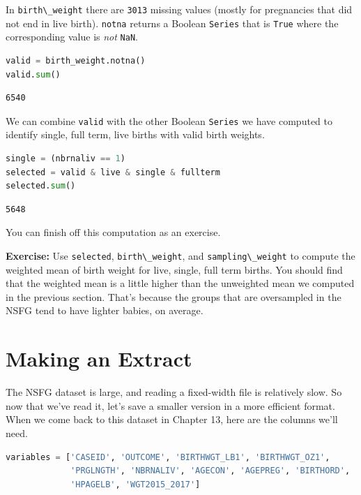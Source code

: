 \documentclass[
]{book}
\newcommand{\passthrough}[1]{#1}
\begin{document}
In \passthrough{\lstinline!birth\_weight!} there are
\passthrough{\lstinline!3013!} missing values (mostly for pregnancies
that did not end in live birth). \passthrough{\lstinline!notna!} returns
a Boolean \passthrough{\lstinline!Series!} that is
\passthrough{\lstinline!True!} where the corresponding value is
\emph{not} \passthrough{\lstinline!NaN!}.

\begin{lstlisting}[language=Python]
valid = birth_weight.notna()
valid.sum()
\end{lstlisting}

\begin{lstlisting}
6540
\end{lstlisting}

We can combine \passthrough{\lstinline!valid!} with the other Boolean
\passthrough{\lstinline!Series!} we have computed to identify single,
full term, live births with valid birth weights.

\begin{lstlisting}[language=Python]
single = (nbrnaliv == 1)
selected = valid & live & single & fullterm
selected.sum()
\end{lstlisting}

\begin{lstlisting}
5648
\end{lstlisting}

You can finish off this computation as an exercise.

\textbf{Exercise:} Use \passthrough{\lstinline!selected!},
\passthrough{\lstinline!birth\_weight!}, and
\passthrough{\lstinline!sampling\_weight!} to compute the weighted mean
of birth weight for live, single, full term births. You should find that
the weighted mean is a little higher than the unweighted mean we
computed in the previous section. That's because the groups that are
oversampled in the NSFG tend to have lighter babies, on average.

\section{Making an Extract}\label{making-an-extract}

The NSFG dataset is large, and reading a fixed-width file is relatively
slow. So now that we've read it, let's save a smaller version in a more
efficient format. When we come back to this dataset in Chapter 13, here
are the columns we'll need.

\begin{lstlisting}[language=Python]
variables = ['CASEID', 'OUTCOME', 'BIRTHWGT_LB1', 'BIRTHWGT_OZ1',
             'PRGLNGTH', 'NBRNALIV', 'AGECON', 'AGEPREG', 'BIRTHORD',
             'HPAGELB', 'WGT2015_2017']
\end{lstlisting}
\end{document}
